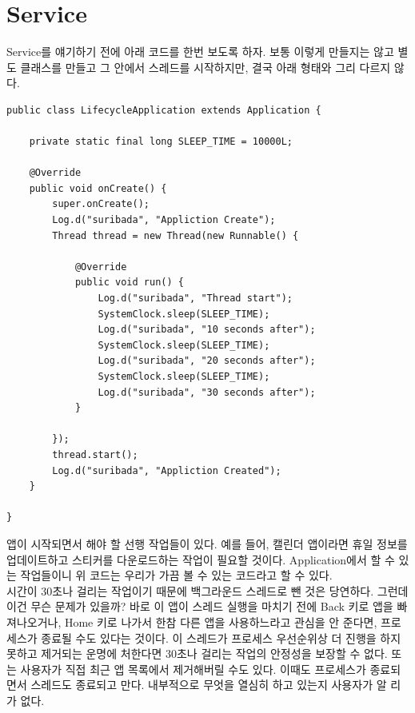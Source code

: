 \chapter{Service}
Service를 얘기하기 전에 아래 코드를 한번 보도록 하자. 보통 이렇게 만들지는 않고 별도 클래스를 만들고 그 안에서 스레드를 시작하지만, 결국 아래 형태와 그리 다르지 않다.
\begin{lstlisting}[frame=single]
public class LifecycleApplication extends Application {
	
	private static final long SLEEP_TIME = 10000L;
	
	@Override
	public void onCreate() {
		super.onCreate();
		Log.d("suribada", "Appliction Create");
		Thread thread = new Thread(new Runnable() {

			@Override
			public void run() {
				Log.d("suribada", "Thread start");
				SystemClock.sleep(SLEEP_TIME);
				Log.d("suribada", "10 seconds after");
				SystemClock.sleep(SLEEP_TIME);
				Log.d("suribada", "20 seconds after");
				SystemClock.sleep(SLEEP_TIME);
				Log.d("suribada", "30 seconds after");
			}
			
		});
		thread.start();
		Log.d("suribada", "Appliction Created");
	}

}
\end{lstlisting}

앱이 시작되면서 해야 할 선행 작업들이 있다. 예를 들어, 캘린더 앱이라면 휴일 정보를 업데이트하고 스티커를 다운로드하는 작업이 필요할 것이다. Application에서 할 수 있는 작업들이니 위 코드는 우리가 가끔 볼 수 있는 코드라고 할 수 있다.\\

시간이 30초나 걸리는 작업이기 때문에 백그라운드 스레드로 뺀 것은 당연하다. 그런데 이건 무슨 문제가 있을까? 
바로 이 앱이 스레드 실행을 마치기 전에 Back 키로 앱을 빠져나오거나, Home 키로 나가서 한참 다른 앱을 사용하느라고 관심을 안 준다면, 프로세스가 종료될 수도 있다는 것이다. 이 스레드가 프로세스 우선순위상 더 진행을 하지 못하고 제거되는 운명에 처한다면 30초나 걸리는 작업의 안정성을 보장할 수 없다.
또는 사용자가 직접 최근 앱 목록에서 제거해버릴 수도 있다. 이때도 프로세스가 종료되면서 스레드도 종료되고 만다. 내부적으로 무엇을 열심히 하고 있는지 사용자가 알 리가 없다.\\

